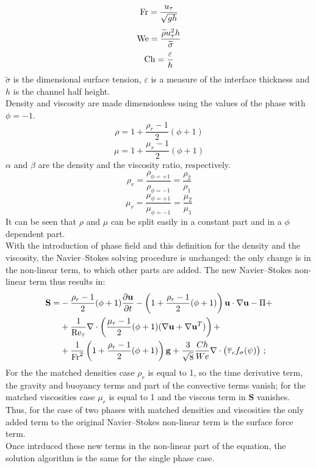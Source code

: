 \[
\textnormal{Fr}=\frac{u_\tau}{\sqrt{gh}}
\]
\[
\textnormal{We}=\dfrac{\widetilde{\rho} u_\tau^2 h}{\widetilde{\sigma}} 
\]
\[
\textnormal{Ch}=\dfrac{\varepsilon}{h} 
\]
$\widetilde{\sigma}$ is the dimensional surface tension, $\varepsilon$ is a measure of the interface thickness and $h$ is the channel half height.\\
Density and viscosity are made dimensionless using the values of the phase with $\phi=-1$.
\[
\rho=1+\frac{\rho_r-1}{2}(\phi+1)
\]
\[
\mu=1+\frac{\mu_r-1}{2}(\phi+1)
\]
$\alpha$ and $\beta$ are the density and the viscosity ratio, respectively.
\[
\rho_r=\frac{\rho_{\phi=+1}}{\rho_{\phi=-1}}=\frac{\rho_2}{\rho_1}
\]
\[
\mu_r=\frac{\mu_{\phi=+1}}{\mu_{\phi=-1}}=\frac{\mu_2}{\mu_1}
\]
It can be seen that $\rho$ and $\mu$ can be split easily in a constant part and in a $\phi$ dependent part.\\
With the introduction of phase field and this definition for the density and the viscosity, the Navier--Stokes solving procedure is unchanged: the only change is in the non-linear term, to which other parts are added. The new Navier--Stokes non-linear term thus results in:
\[
\begin{split}
\mathbf{S}=&-\frac{\rho_r-1}{2}(\phi+1)\frac{\partial\mathbf{u}}{\partial t}-\left(1+\frac{\rho_r-1}{2}(\phi+1)\right)\mathbf{u}\cdot\nabla\mathbf{u}-\Pi+ \\
& +\frac{1}{\textnormal{Re}_\tau}\nabla\cdot\left(\frac{\mu_r-1}{2}(\phi+1)(\nabla\mathbf{u}+\nabla\mathbf{u}^T)\right)+\\
&+\frac{1}{\textnormal{Fr}^2}\left(1+\frac{\rho_r-1}{2}(\phi+1)\right)\mathbf{g}+\frac{3}{\sqrt{8}}\frac{Ch}{We}\nabla\cdot\left( \overline{\tau}_c f_\sigma (\psi) \right) \, ;
\end{split}
\]
For the the matched densities case $\rho_r$ is equal to 1, so the time derivative term, the gravity and buoyancy terms and part of the convective terms vanish; for the matched viscosities case $\mu_r$ is equal to 1 and the viscous term in $\mathbf{S}$ vanishes.\\
Thus, for the case of two phases with matched densities and viscosities the only added term to the original Navier--Stokes non-linear term is the surface force term.\\
Once intrduced these new terms in the non-linear part of the equation, the solution algorithm is the same for the single phase case.

